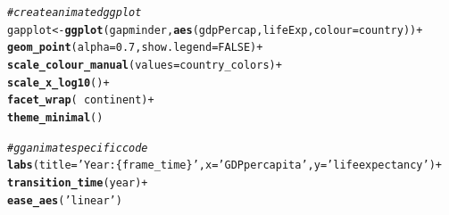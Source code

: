 \documentclass{article}\usepackage[]{graphicx}\usepackage[]{xcolor}
\makeatletter
\newcommand{\hlnum}[1]{\textcolor[rgb]{0.686,0.059,0.569}{#1}}%
\newcommand{\hlstr}[1]{\textcolor[rgb]{0.192,0.494,0.8}{#1}}%
\newcommand{\hlcom}[1]{\textcolor[rgb]{0.678,0.584,0.686}{\textit{#1}}}%
\newcommand{\hlopt}[1]{\textcolor[rgb]{0,0,0}{#1}}%
\newcommand{\hlstd}[1]{\textcolor[rgb]{0.345,0.345,0.345}{#1}}%
\newcommand{\hlkwb}[1]{\textcolor[rgb]{0.69,0.353,0.396}{#1}}%
\newcommand{\hlkwc}[1]{\textcolor[rgb]{0.333,0.667,0.333}{#1}}%
\newcommand{\hlkwd}[1]{\textcolor[rgb]{0.737,0.353,0.396}{\textbf{#1}}}%
\newenvironment{kframe}{%
 \def\at@end@of@kframe{}%
 \ifinner\ifhmode%
  \def\at@end@of@kframe{\end{minipage}}%
  \begin{minipage}{\columnwidth}%
 \fi\fi%
 \def\FrameCommand##1{\hskip\@totalleftmargin \hskip-\fboxsep
 \colorbox{shadecolor}{##1}\hskip-\fboxsep
     \hskip-\linewidth \hskip-\@totalleftmargin \hskip\columnwidth}%
 \MakeFramed {\advance\hsize-\width
   \@totalleftmargin\z@ \linewidth\hsize
   \@setminipage}}%
 {\par\unskip\endMakeFramed%
 \at@end@of@kframe}
\newenvironment{knitrout}{}{} %
\numberwithin{equation}{section}
\makeatother
\begin{document}
\begin{knitrout}\scriptsize
{}\color{fgcolor}\begin{kframe}
\begin{alltt}
\hlcom{# create animated ggplot}
\hlstd{gapplot}\hlkwb{<-}\hlkwd{ggplot}\hlstd{(gapminder,} \hlkwd{aes}\hlstd{(gdpPercap, lifeExp,} \hlkwc{colour} \hlstd{= country))} \hlopt{+}
  \hlkwd{geom_point}\hlstd{(}\hlkwc{alpha} \hlstd{=} \hlnum{0.7}\hlstd{,} \hlkwc{show.legend} \hlstd{=} \hlnum{FALSE}\hlstd{)} \hlopt{+}
  \hlkwd{scale_colour_manual}\hlstd{(}\hlkwc{values} \hlstd{= country_colors)} \hlopt{+}
  \hlkwd{scale_x_log10}\hlstd{()} \hlopt{+}
  \hlkwd{facet_wrap}\hlstd{(}\hlopt{~}\hlstd{continent)} \hlopt{+}
  \hlkwd{theme_minimal}\hlstd{()}

  \hlcom{# gganimate specific code}
  \hlkwd{labs}\hlstd{(}\hlkwc{title} \hlstd{=} \hlstr{'Year: \{frame_time\}'}\hlstd{,} \hlkwc{x} \hlstd{=} \hlstr{'GDP per capita'}\hlstd{,} \hlkwc{y} \hlstd{=} \hlstr{'life expectancy'}\hlstd{)} \hlopt{+}
  \hlkwd{transition_time}\hlstd{(year)} \hlopt{+}
  \hlkwd{ease_aes}\hlstd{(}\hlstr{'linear'}\hlstd{)}
\end{alltt}
\end{kframe}
\end{knitrout}
\end{document}
